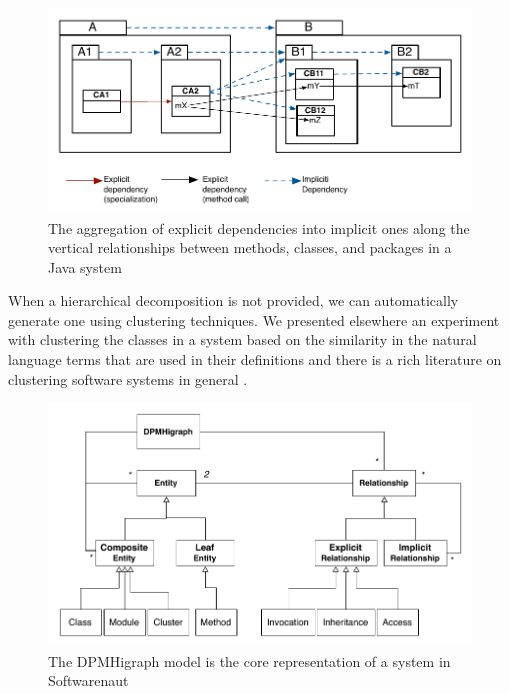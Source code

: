 \documentclass[preprint,12pt]{elsarticle}
\begin{document}
\begin{figure}[h]
\begin{center}
\includegraphics[width=0.8\linewidth]{images/DependencyAggregation}
\caption{The aggregation of explicit dependencies into implicit ones along the vertical relationships between methods, classes, and packages in a Java system}
\label{dep-agg}
\end{center}
\end{figure}

When a hierarchical decomposition is not provided, we can automatically generate one using clustering techniques. We presented elsewhere an experiment with clustering the classes in a system based on the similarity in the natural language terms that are used in their definitions \cite{Lung05a} and there is a rich literature on clustering software systems in general \cite{koschke-thesis}.

\begin{figure}[h]
\begin{center}
\includegraphics[width=0.7\linewidth]{images/HigraphModel}
\caption{The DPMHigraph model is the core representation of a system in Softwarenaut}
\end{center}
\end{figure}
\end{document}
